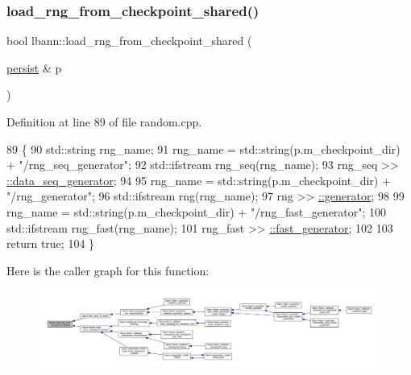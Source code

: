 \subsubsection{\texorpdfstring{load\+\_\+rng\+\_\+from\+\_\+checkpoint\+\_\+shared()}{load\_rng\_from\_checkpoint\_shared()}}
{\footnotesize\ttfamily bool lbann\+::load\+\_\+rng\+\_\+from\+\_\+checkpoint\+\_\+shared (\begin{DoxyParamCaption}\item[{\hyperlink{classlbann_1_1persist}{persist} \&}]{p }\end{DoxyParamCaption})}



Definition at line 89 of file random.\+cpp.


\begin{DoxyCode}
89                                                 \{
90   std::string rng\_name;
91   rng\_name = std::string(p.m\_checkpoint\_dir) + \textcolor{stringliteral}{"/rng\_seq\_generator"};
92   std::ifstream rng\_seq(rng\_name);
93   rng\_seq >> \hyperlink{namespaceanonymous__namespace_02random_8cpp_03_ac1d3d0259f3e9c9b75e9701ae727d16e}{::data\_seq\_generator};
94 
95   rng\_name = std::string(p.m\_checkpoint\_dir) + \textcolor{stringliteral}{"/rng\_generator"};
96   std::ifstream rng(rng\_name);
97   rng >> \hyperlink{namespaceanonymous__namespace_02random_8cpp_03_a83826c4b587d1825f13b833be6fe047f}{::generator};
98  
99   rng\_name = std::string(p.m\_checkpoint\_dir) + \textcolor{stringliteral}{"/rng\_fast\_generator"};
100   std::ifstream rng\_fast(rng\_name);
101   rng\_fast >> \hyperlink{namespaceanonymous__namespace_02random_8cpp_03_a349f572cec05cd0e2469b799774a8602}{::fast\_generator};
102 
103   \textcolor{keywordflow}{return} \textcolor{keyword}{true};
104 \}
\end{DoxyCode}
Here is the caller graph for this function\+:\nopagebreak
\begin{figure}[H]
\begin{center}
\leavevmode
\includegraphics[width=350pt]{namespacelbann_ab76114a0e8cc90c28bcb9e7d01eec89a_icgraph}
\end{center}
\end{figure}
\mbox{\label{namespacelbann_a8830dea8eef0ab5b93d68e2358ceeb1a}} 
